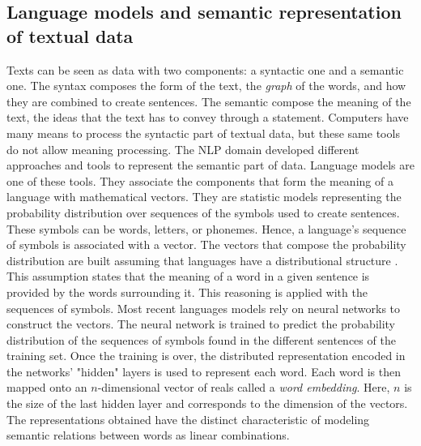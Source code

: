 \subsection{Language models and semantic representation of textual data}
Texts can be seen as data with two components: a syntactic one and a semantic one.
The syntax composes the form of the text, the \emph{graph} of the words, and how they are combined to create sentences.
The semantic compose the meaning of the text, the ideas that the text has to convey through a statement.
Computers have many means to process the syntactic part of textual data, but these same tools do not allow meaning processing.
The NLP domain developed different approaches and tools to represent the semantic part of data.
Language models are one of these tools.
They associate the components that form the meaning of a language with mathematical vectors.
They are statistic models representing the probability distribution over sequences of the symbols used to create sentences.
These symbols can be words, letters, or phonemes.
Hence, a language's sequence of symbols is associated with a vector.
The vectors that compose the probability distribution are built assuming that languages have a distributional structure \parencite{harrisDistributionalStructure1954}.
This assumption states that the meaning of a word in a given sentence is provided by the words surrounding it.
This reasoning is applied with the sequences of symbols.
Most recent languages models rely on neural networks to construct the vectors.
The neural network is trained to predict the probability distribution of the sequences of symbols found in the different sentences of the training set.
Once the training is over, the distributed representation encoded in the networks' "hidden" layers is used to represent each word.
Each word is then mapped onto an \(n\)-dimensional vector of reals called a \emph{word embedding}.
Here, \(n\) is the size of the last hidden layer and corresponds to the dimension of the vectors.
The representations obtained have the distinct characteristic of modeling semantic relations between words as linear combinations.

